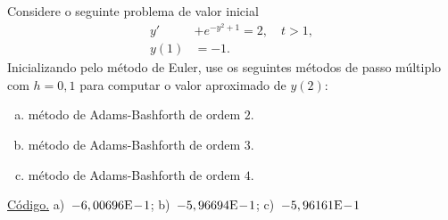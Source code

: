 \begin{exer}
  Considere o seguinte problema de valor inicial
  \begin{align}
    y' &+ e^{-y^2+1} = 2,\quad t>1,\\
    y(1) &= -1.
  \end{align}
Inicializando pelo método de Euler, use os seguintes métodos de passo múltiplo com $h=0,1$ para computar o valor aproximado de $y(2)$:
\begin{enumerate}[a)]
\item método de Adams-Bashforth de ordem $2$.
\item método de Adams-Bashforth de ordem $3$.
\item método de Adams-Bashforth de ordem $4$.
\end{enumerate}
\end{exer}
\begin{resp}
  \ifisoctave 
  \href{https://github.com/phkonzen/notas/blob/master/src/MatematicaNumerica/cap_pvi/dados/exer_AB_pvi1/exer_AB_pvi1.m}{Código.} 
  \fi
  a)~$-6,00696\mathrm{E}\!-\!1$; b)~$-5,96694\mathrm{E}\!-\!1$; c)~$-5,96161\mathrm{E}\!-\!1$
\end{resp}

